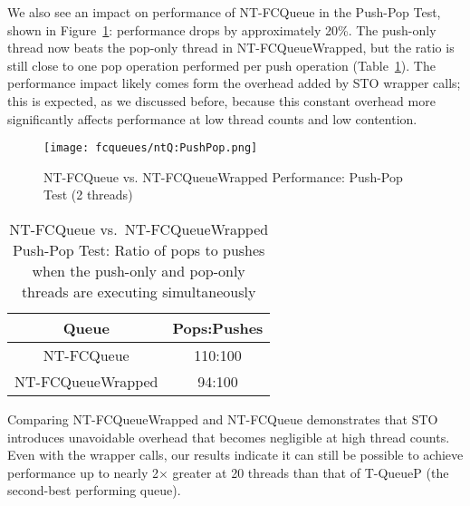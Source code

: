 We also see an impact on performance of NT-FCQueue in the Push-Pop Test, shown in Figure~\ref{fig:wrappedqs_pp}: performance drops by approximately 20\%. The push-only thread now beats the pop-only thread in NT-FCQueueWrapped, but the ratio is still close to one pop operation performed per push operation (Table~\ref{tab:nt_pop_push_ratio}). The performance impact likely comes form the overhead added by STO wrapper calls; this is expected, as we discussed before, because this constant overhead more significantly affects performance at low thread counts and low contention.


\begin{figure}[t!]
    \centering
	\begin{minipage}{0.9\textwidth}
        {\texttt{[image: fcqueues/ntQ:PushPop.png]}}
	\end{minipage}
    \caption{NT-FCQueue vs. NT-FCQueueWrapped Performance: Push-Pop Test (2 threads)}
    \label{fig:wrappedqs_pp}
\end{figure}
\begin{table}[ht!]
        \centering
    \begin{tabular}{|cc|}
        \hline
        Queue & Pops:Pushes\\
        \hline
            NT-FCQueue & 110:100\\
            NT-FCQueueWrapped & 94:100\\
        \hline
    \end{tabular}
    \caption{NT-FCQueue vs.\ NT-FCQueueWrapped Push-Pop Test: Ratio of pops to pushes when the push-only and pop-only threads are executing simultaneously}
    \label{tab:nt_pop_push_ratio}
\end{table}


Comparing NT-FCQueueWrapped and NT-FCQueue demonstrates that STO introduces unavoidable overhead that becomes negligible at high thread counts. Even with the wrapper calls, our results indicate it can still be possible to achieve performance up to nearly 2$\times$ greater at 20 threads than that of T-QueueP (the second-best performing queue).

\vspace{12pt}
\noindent{}

